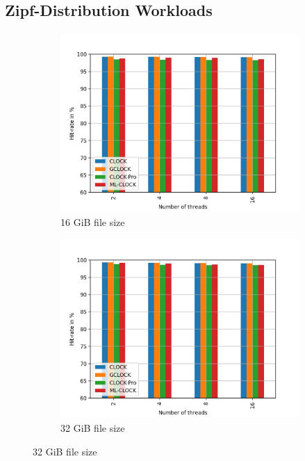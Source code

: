 \documentclass[
	12pt,
	a4paper,
	abstract,
	bibliography=totoc,
	chapterprefix,
	headings=openright,
	numbers=endperiod,
	parskip=half,
	twoside,
]{scrreprt}
\begin{document}
\subsection{Zipf-Distribution Workloads}
\begin{figure}[H]
	\centering
	\begin{subfigure}{0.4\textwidth}
		\includegraphics[width=\textwidth]{multi_16_gb_randread_zipf.jpg}		
		\caption{16 GiB file size}
		\label{fig:rw_90to10  zipf}
	\end{subfigure}
	\hfill
	\begin{subfigure}{0.4\textwidth}
		\includegraphics[width=\textwidth]{multi_32_gb_randread_zipf.jpg}		
		\caption{32 GiB file size}
		\label{fig:rw_90to10  normal}

\end{subfigure}
\end{figure}
\end{document}
